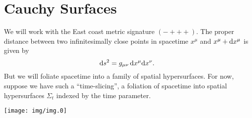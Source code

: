 \section{Cauchy Surfaces}

We will work with the East coast metric signature $(-+++)$. The proper
distance between two infinitesimally close points in spacetime $x^{\mu}$
and $x^{\mu} + \mathrm{d} x^{\mu}$ is given by
\begin{equation}
\mathrm{d} s^{2} = g_{\mu\nu}\,\mathrm{d} x^{\mu}\mathrm{d} x^{\nu}.
\end{equation}
But we will foliate spacetime into a family of spatial
hypersurfaces. For now, suppose we have such a ``time-slicing'', a
foliation of spacetime into spatial hypersurfaces $\Sigma_{t}$ indexed
by the time parameter.

\begin{center}
  \texttt{[image: img/img.0]}
\end{center}

